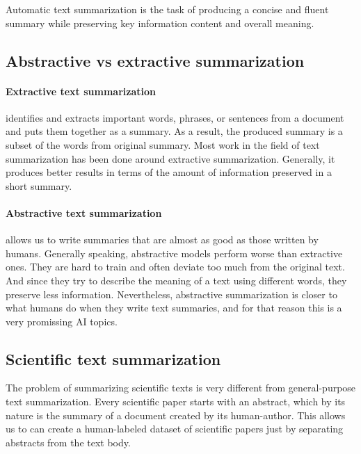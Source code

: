 \documentclass[sigplan]{acmart}
\begin{document}
Automatic text summarization is the task of producing a concise and fluent summary while preserving key information content and overall meaning\cite{allahyari-17}.

\subsection{Abstractive vs extractive summarization}

\paragraph{Extractive text summarization} identifies and extracts important words, phrases, or sentences from a document and puts them together as a summary. As a result, the produced summary is a subset of the words from original summary\cite{kumar-16}. Most work in the field of text summarization has been done around extractive summarization. Generally, it produces better results in terms of the amount of information preserved in a short summary. 

\paragraph{Abstractive text summarization} allows us to write summaries that are almost as good as those written by humans. Generally speaking, abstractive models perform worse than extractive ones. They are hard to train and often deviate too much from the original text. And since they try to describe the meaning of a text using different words, they preserve less information. Nevertheless, abstractive summarization is closer to what humans do when they write text summaries, and for that reason this is a very promissing AI topics.

\subsection{Scientific text summarization}

The problem of summarizing scientific texts is very different from general-purpose text summarization. Every scientific paper starts with an abstract, which by its nature is the summary of a document created by its human-author. This allows us to can create a human-labeled dataset of scientific papers just by separating abstracts from the text body.

\end{document}
